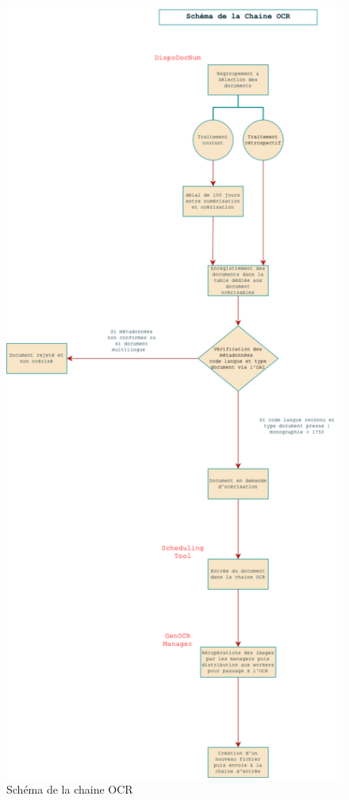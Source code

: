 \documentclass[a4paper,12pt,twoside]{book}
\begin{document}
\begin{figure}
	\centering
	\includegraphics[width=0.7\linewidth]{images/schem_ocr_bnf}
	\caption{Schéma de la chaine OCR}
	\label{fig:schemocrbnf}
\end{figure}
\end{document}
